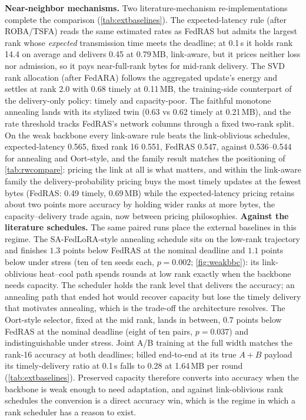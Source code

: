 \documentclass[a4paper,fleqn]{cas-dc}
\begin{document}
\textbf{Near-neighbor mechanisms.} Two literature-mechanism re-implementations complete the comparison (\cref{tab:extbaselines}). The expected-latency rule (after ROBA/TSFA) reads the same estimated rates as FedRAS but admits the largest rank whose \emph{expected} transmission time meets the deadline; at 0.1\,s it holds rank 14.4 on average and delivers 0.45 at 0.79\,MB, link-aware, but it prices neither loss nor admission, so it pays near-full-rank bytes for mid-rank delivery. The SVD rank allocation (after FedARA) follows the aggregated update's energy and settles at rank 2.0 with 0.68 timely at 0.11\,MB, the training-side counterpart of the delivery-only policy: timely and capacity-poor. The faithful monotone annealing lands with its stylized twin (0.63 vs 0.62 timely at 0.21\,MB), and the rate threshold tracks FedRAS's network columns through a fixed two-rank split. On the weak backbone every link-aware rule beats the link-oblivious schedules, expected-latency 0.565, fixed rank 16 0.551, FedRAS 0.547, against 0.536--0.544 for annealing and Oort-style, and the family result matches the positioning of \cref{tab:rwcompare}: pricing the link at all is what matters, and within the link-aware family the delivery-probability pricing buys the most timely updates at the fewest bytes (FedRAS: 0.49 timely, 0.69\,MB) while the expected-latency pricing retains about two points more accuracy by holding wider ranks at more bytes, the capacity--delivery trade again, now between pricing philosophies.
\textbf{Against the literature schedules.} The same paired runs place the external baselines in this regime. The SA-FedLoRA-style annealing schedule sits on the low-rank trajectory and finishes $1.3$ points below FedRAS at the nominal deadline and $1.1$ points below under stress (ten of ten seeds each, $p = 0.002$; \cref{fig:weakbbc}): its link-oblivious heat--cool path spends rounds at low rank exactly when the backbone needs capacity. The scheduler holds the rank level that delivers the accuracy; an annealing path that ended hot would recover capacity but lose the timely delivery that motivates annealing, which is the trade-off the architecture resolves. The Oort-style selector, fixed at the mid rank, lands in between, $0.7$ points below FedRAS at the nominal deadline (eight of ten pairs, $p = 0.037$) and indistinguishable under stress. Joint A/B training at the full width matches the rank-16 accuracy at both deadlines; billed end-to-end at its true $A{+}B$ payload its timely-delivery ratio at 0.1\,s falls to 0.28 at 1.64\,MB per round (\cref{tab:extbaselines}). Preserved capacity therefore converts into accuracy when the backbone is weak enough to need adaptation, and against link-oblivious rank schedules the conversion is a direct accuracy win, which is the regime in which a rank scheduler has a reason to exist.
\end{document}
